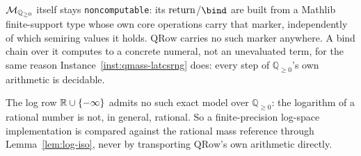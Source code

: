 $\mathcal M_{\mathbb Q_{\ge 0}}$ itself stays \texttt{noncomputable}: its
$\mathrm{return}$/$\bind$ are built from a Mathlib finite-support type whose own
core operations carry that marker, independently of which semiring
values it holds. $\mathrm{QRow}$ carries no such marker anywhere. A
bind chain over it computes to a concrete numeral, not an unevaluated
term, for the same reason Instance~\ref{inst:qmass-latcsrng} does: every
step of $\mathbb Q_{\ge 0}$'s own arithmetic is decidable.

The log row $\mathbb R \cup \{-\infty\}$ admits no such exact model over $\mathbb Q_{\ge
0}$: the logarithm of a rational number is not, in general, rational.
So a finite-precision log-space implementation is compared against the
rational mass reference through Lemma~\ref{lem:log-iso}, never by
transporting $\mathrm{QRow}$'s own arithmetic directly.

